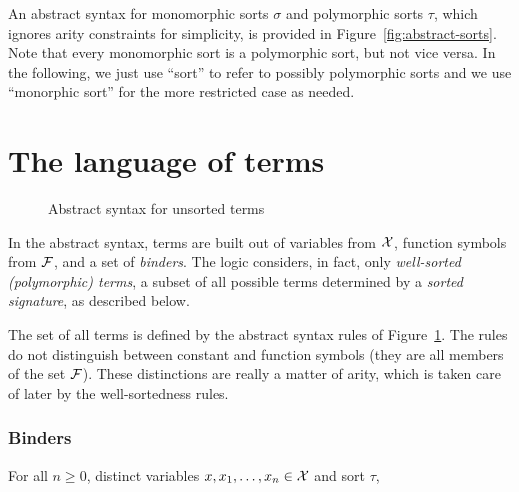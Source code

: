 An abstract syntax for monomorphic sorts $\sigma$ and polymorphic sorts $\tau$,
which ignores arity constraints for simplicity, 
is provided in Figure~\ref{fig:abstract-sorts}.
Note that every monomorphic sort is a polymorphic sort, but not vice versa.
In the following, we just use ``sort'' to refer to possibly polymorphic sorts
and we use ``monorphic sort'' for the more restricted case as needed.

%



\section{The language of terms} \label{sec:language}

\begin{figure}
\terms
\caption{Abstract syntax for unsorted terms}
\label{fig:abstract-terms}
\end{figure}

In the abstract syntax,
terms are built out of variables from $\mathcal{X}$, 
function symbols from $\mathcal{F}$, 
and a set of \emph{binders}.
%
The logic considers, in fact, only \emph{well-sorted (polymorphic) terms},
a subset of all possible terms determined 
by a \emph{sorted signature}, as described below.

The set of all terms is defined by the abstract syntax rules of 
Figure~\ref{fig:abstract-terms}.
The rules do not distinguish between constant and function symbols
(they are all members of the set $\mathcal{F}$). 
These distinctions are really a matter of arity, 
which is taken care of later by the well-sortedness rules.

\subsubsection{Binders}

For all $n \geq 0$,
distinct variables $x, x_1, \ldots, x_n \in \mathcal{X}$ and sort $\tau$,


